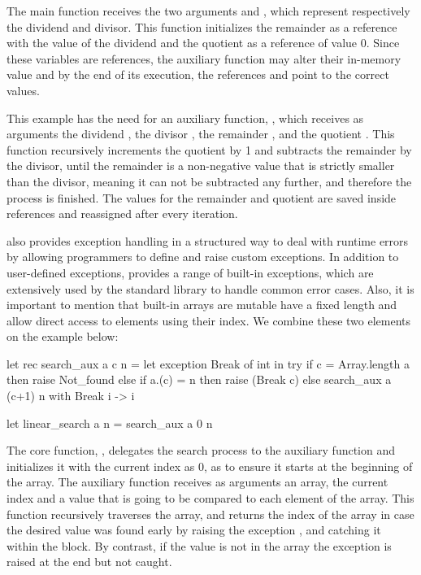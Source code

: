 The main function  receives the two arguments  and , which represent respectively
the dividend and divisor. This function initializes the remainder  as a reference with the value of the dividend 
 and the quotient  as a reference of value 0. Since these variables are references, the auxiliary function
may alter their in-memory value and by the end of its execution, the references  and  point to the correct 
values.

This example has the need for an auxiliary function, , which receives as arguments the dividend 
, the divisor , the remainder , and the quotient . This function recursively
increments the quotient by 1 and subtracts the remainder by the divisor, until the remainder 
is a non-negative value that is strictly smaller than the divisor, meaning it can not be subtracted any further, and therefore the 
process is finished. The values for the remainder and quotient are saved inside references and reassigned after every iteration.

\ocaml also provides exception handling in a structured way to deal with runtime errors by allowing programmers to define 
and raise custom exceptions. In addition to user-defined exceptions, \ocaml provides a range of built-in exceptions, which are 
extensively used by the standard library to handle common error cases. Also, it is important to mention that built-in arrays are mutable
have a fixed length and allow direct access to elements using their index. We combine these two elements on the example below:

\begin{ocamlenv}
let rec search_aux a c n =
  let exception Break of int in try
    if c = Array.length a then raise Not_found 
    else if a.(c) = n then raise (Break c) 
    else search_aux a (c+1) n
  with Break i -> i

let linear_search a n = search_aux a 0 n
\end{ocamlenv}

The core function, , delegates the search process to the auxiliary function and initializes it with the current
index as 0, as to ensure it starts at the beginning of the array. The auxiliary function  receives as arguments 
an array, the current index and a value that is going to be 
compared to each element of the array. This function recursively traverses the array, and returns the index of the array in case the desired 
value was found early by raising the exception , and catching it within the  block. By contrast, 
if the value is not in the array the exception  is raised at the end but not caught.

